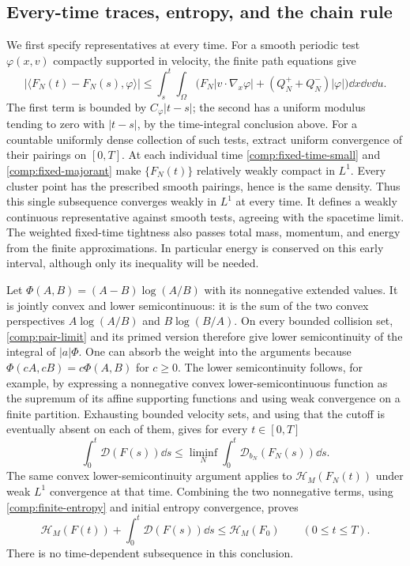 \subsection{Every-time traces, entropy, and the chain rule}

We first specify representatives at every time. For a smooth periodic
test \(\varphi(x,v)\) compactly supported in velocity, the finite path
equations give
\[
|\langle F_N(t)-F_N(s),\varphi\rangle|
\leq\int_s^t\int_\Omega
 \bigl(F_N|v\cdot\nabla_x\varphi|
       +(Q_N^++Q_N^-)|\varphi|\bigr)\dd x\dd v\dd u.
\]
The first term is bounded by \(C_\varphi|t-s|\); the second has a
uniform modulus tending to zero with \(|t-s|\), by the time-integral
conclusion above. For a countable uniformly dense collection of such
tests, extract uniform convergence of their pairings on \([0,T]\).
At each individual time \eqref{comp:fixed-time-small} and
\eqref{comp:fixed-majorant} make \(\{F_N(t)\}\) relatively weakly
compact in \(L^1\). Every cluster point has the prescribed smooth
pairings, hence is the same density. Thus this single subsequence
converges weakly in \(L^1\) at every time. It defines a weakly
continuous representative against smooth tests, agreeing with the
spacetime limit. The weighted fixed-time tightness also passes total
mass, momentum, and energy from the finite approximations. In
particular energy is conserved on this early interval, although only
its inequality will be needed.

Let
\(\Phi(A,B)=(A-B)\log(A/B)\) with its nonnegative extended values.
It is jointly convex and lower semicontinuous: it is the sum of the
two convex perspectives \(A\log(A/B)\) and \(B\log(B/A)\).
On every bounded collision set, \eqref{comp:pair-limit} and its primed
version therefore give lower semicontinuity of the integral of
\(|a|\Phi\). One can absorb the weight into the arguments because
\(\Phi(cA,cB)=c\Phi(A,B)\) for \(c\geq0\). The lower
semicontinuity follows, for example, by expressing a nonnegative convex
lower-semicontinuous function as the supremum of its affine supporting
functions and using weak convergence on a finite partition. Exhausting
bounded velocity sets, and using that the cutoff is eventually absent
on each of them, gives for every \(t\in[0,T]\)
\[
\int_0^t\mathcal D(F(s))\dd s
\leq\liminf_N\int_0^t\mathcal D_{b_N}(F_N(s))\dd s.
\]
The same convex lower-semicontinuity argument applies to
\(\mathcal H_M(F_N(t))\) under weak \(L^1\) convergence at that
time. Combining the two nonnegative terms, using
\eqref{comp:finite-entropy} and initial entropy convergence, proves
\begin{equation}\label{comp:limit-entropy}
\mathcal H_M(F(t))+\int_0^t\mathcal D(F(s))\dd s
\leq\mathcal H_M(F_0)\qquad(0\leq t\leq T).
\end{equation}
There is no time-dependent subsequence in this conclusion.

